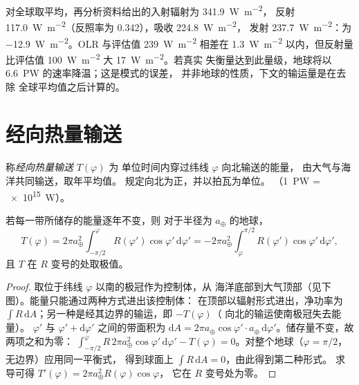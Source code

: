 \begin{example}[再分析资料的全球收支]\label{ex:b1:radiation-heat-transport:global}
对全球取平均，再分析资料给出的入射辐射为 \qty{341.9}{W.m^{-2}}，
反射 \qty{117.0}{W.m^{-2}}（反照率为 \num{0.342}），吸收 \qty{224.8}{W.m^{-2}}，
发射 \qty{237.7}{W.m^{-2}}：为 \qty{-12.9}{W.m^{-2}}。OLR 与评估值
\qty{239}{W.m^{-2}} 相差在 \qty{1.3}{W.m^{-2}} 以内，但反射量
比评估值 \qty{100}{W.m^{-2}} 大 \qty{17}{W.m^{-2}}。若真实
失衡量达到此量级，地球将以 \qty{6.6}{PW} 的速率降温；这是模式的误差，
并非地球的性质，下文的输运量是在去除
全球平均值之后计算的。
\end{example}

\section{经向热量输送}\label{sec:b1:radiation-heat-transport:transport}

\begin{definition}[经向热量输送]\label{def:b1:radiation-heat-transport:mht}
称\emph{经向热量输送} $T(\varphi)$ 为
单位时间内穿过纬线 $\varphi$ 向北输送的能量，
由大气与海洋共同输送，取年平均值。
规定向北为正，并以拍瓦为单位。
（\qty{1}{PW} = \qty{e15}{W}）。
\end{definition}

\begin{proposition}[由净辐射得到的输运]\label{prop:b1:radiation-heat-transport:mht}
若每一带所储存的能量逐年不变，则
对于半径为 $a_\oplus$ 的地球，
\[
  T(\varphi) = 2\pi a_\oplus^2\int_{-\pi/2}^{\varphi} R(\varphi')\cos\varphi'\,
  \mathrm d\varphi' = -2\pi a_\oplus^2\int_{\varphi}^{\pi/2} R(\varphi')\cos
  \varphi'\,\mathrm d\varphi' ,
\]
且 $T$ 在 $R$ 变号的处取极值。
\end{proposition}

\begin{proof}
取位于纬线 $\varphi$ 以南的极冠作为控制体，从
海洋底部到大气顶部（见下图）。能量只能通过两种方式进出该控制体：
在顶部以辐射形式进出，净功率为
$\int R\,\mathrm dA$；另一种是经其边界的输运，即 $-T(\varphi)$（
向北的输运使南极冠失去能量）。 $\varphi'$ 与
$\varphi' + \mathrm d\varphi'$ 之间的带面积为 $\mathrm dA = 2\pi a_\oplus\cos\varphi'
\cdot a_\oplus\,\mathrm d\varphi'$。储存量不变，故两项之和为零：
$\int_{-\pi/2}^{\varphi} R\,2\pi a_\oplus^2\cos\varphi'\,\mathrm d\varphi' -
T(\varphi) = 0$。对整个地球（$\varphi = \pi/2$，无边界）应用同一平衡式，
得到球面上 $\int R\,\mathrm dA = 0$，由此得到第二种形式。
求导可得 $T'(\varphi) = 2\pi a_\oplus^2 R(\varphi)\cos\varphi$，
它在 $R$ 变号处为零。
\end{proof}


